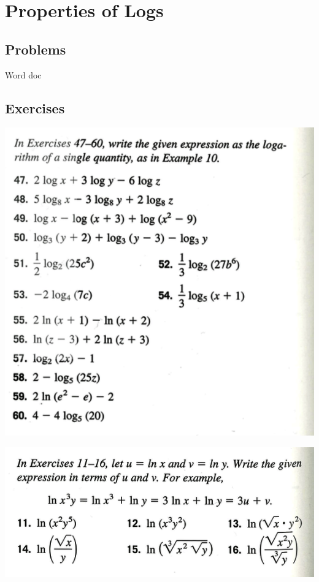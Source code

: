\newpage
\section{Properties of Logs}
\subsection{Problems}
Word doc
\newpage

\newpage
\subsection{Exercises}
\includegraphics[scale=0.5]{ch07/0703xA.png}

\includegraphics[scale=0.5]{ch07/0703xB.png}


